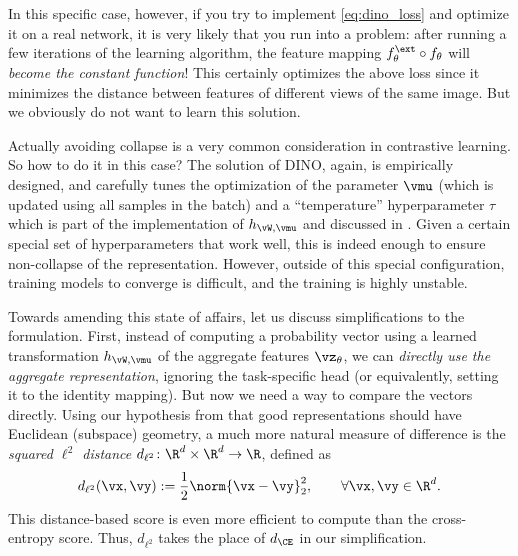 \documentclass[../../book-main.tex]{subfiles}
\begin{document}
In this specific case, however, if you try to implement \eqref{eq:dino_loss} and optimize it on a real network, it is very likely that you run into a problem: after running a few iterations of the learning algorithm, the feature mapping \(f_{\theta}^{\ext} \circ f_{\theta}\) will \textit{become the constant function}! This certainly optimizes the above loss since it minimizes the distance between features of different views of the same image. But we obviously do not want to learn this solution. 

Actually avoiding collapse is a very common consideration in contrastive learning. So how to do it in this case? The solution of DINO, again, is empirically designed, and carefully tunes the optimization of the parameter \(\vmu\) (which is updated using all samples in the batch) and a ``temperature'' hyperparameter \(\tau\) which is part of the implementation of \(h_{\vW, \vmu}\) and discussed in . Given a certain special set of hyperparameters that work well, this is indeed enough to ensure non-collapse of the representation. However, outside of this special configuration, training models to converge is difficult, and the training is highly unstable. 

Towards amending this state of affairs, let us discuss simplifications to the formulation. First, instead of computing a probability vector using a learned transformation \(h_{\vW, \vmu}\) of the aggregate features \(\vz_{\theta}\), we can \textit{directly use the aggregate representation}, ignoring the task-specific head (or equivalently, setting it to the identity mapping). But now we need a way to compare the vectors directly. Using our hypothesis from  that good representations should have Euclidean (subspace) geometry, a much more natural measure of difference is the \textit{squared \(\ell^{2}\) distance} \(d_{\ell^{2}} \colon \R^{d} \times \R^{d} \to \R\), defined as 
\begin{equation}\label{eq:cosine_similarity}
    d_{\ell^{2}}(\vx, \vy) := \frac{1}{2}\norm{\vx - \vy}_{2}^{2}, \qquad  \forall \vx, \vy \in \R^{d}.
\end{equation}
This distance-based score is even more efficient to compute than the cross-entropy score. Thus, \(d_{\ell^{2}}\) takes the place of \(d_{\CE}\) in our simplification. 
\end{document}
